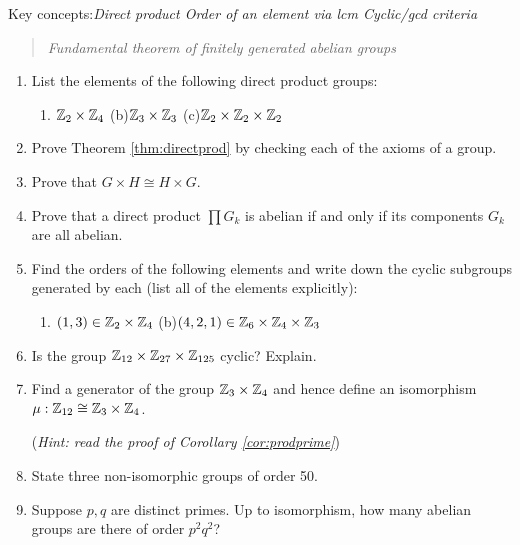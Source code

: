 \begin{exercises}
	Key concepts:\quad \emph{Direct product \quad Order of an element via lcm \quad Cyclic/gcd criteria} 
	\begin{quote}
		\emph{Fundamental theorem of finitely generated abelian groups}
	\end{quote}
	
	
	\begin{enumerate}
		\item List the elements of the following direct product groups:
		\begin{enumerate}
	  	\item $\mathbb{Z}_2\times\mathbb{Z}_4$\qquad\qquad
	  	(b)\lstsp $\mathbb{Z}_3\times\mathbb{Z}_3$\qquad\qquad
	  	(c)\lstsp $\mathbb{Z}_2\times\mathbb{Z}_2\times\mathbb{Z}_2$
		\end{enumerate}
		
		
	  \item Prove Theorem \ref{thm:directprod} by checking each of the axioms of a group.
	
	
		\item Prove that $G\times H\cong H\times G$.
		
		
		\item Prove that a direct product $\prod G_k$ is abelian if and only if its components $G_k$ are all abelian.
		
		
		\item Find the orders of the following elements and write down the cyclic subgroups generated by each (list all of the elements explicitly):
		\begin{enumerate}
	  	\item $(1,3)\in\mathbb{Z}_2\times\mathbb{Z}_4$\qquad\qquad
	  	(b)\lstsp $(4,2,1)\in\mathbb{Z}_6\times\mathbb{Z}_4\times\mathbb{Z}_3$
		\end{enumerate}
		
		
		\item Is the group $\mathbb{Z}_{12}\times \mathbb{Z}_{27}\times\mathbb{Z}_{125}$ cyclic? Explain.
	
	
		\item Find a generator of the group $\mathbb{Z}_3\times\mathbb{Z}_4$ and hence define an isomorphism $\mu:\mathbb{Z}_{12}\cong\mathbb{Z}_3\times\mathbb{Z}_4$.\par
		(\emph{Hint: read the proof of Corollary \ref{cor:prodprime}})
	
	
		\item State three non-isomorphic groups of order 50.
		
		
		\item Suppose $p,q$ are distinct primes. Up to isomorphism, how many abelian groups are there of order $p^2q^2$?
		

\end{enumerate}
\end{exercises}
